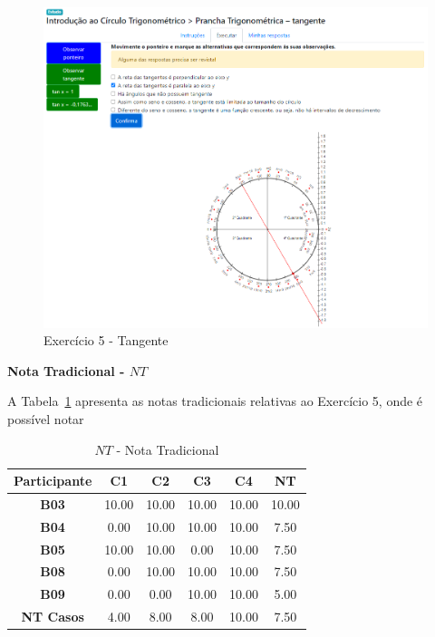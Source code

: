 \begin{figure}[htb]
	\centering
	\includegraphics[width=0.9\linewidth]{chapters/results/Fase 3/E5_Virtual.png}
	\caption{Exercício 5 - Tangente}
	\label{fig:E5}
\end{figure}

\textbf{Nota Tradicional - $NT$}

A Tabela~\ref{tab:F3_A5_NT} apresenta as notas tradicionais relativas ao Exercício 5, onde é possível notar 

\begin{table}[htbp]
	\centering
	\caption{$NT$ - Nota Tradicional}
	\begin{tabular}{|c|c|c|c|c|c|}
		\hline
		\rowcolor[HTML]{D9D9D9} 
		\textbf{Participante} & \textbf{C1} & \textbf{C2} & \textbf{C3} & \textbf{C4} & \textbf{NT} \\ \hline
		\rowcolor[HTML]{FFFFFF} 
		\textbf{B03} & 10.00 & 10.00 & 10.00 & 10.00 & 10.00 \\ \hline
		\rowcolor[HTML]{E7E6E6} 
		\textbf{B04} & 0.00 & 10.00 & 10.00 & 10.00 & 7.50 \\ \hline
		\rowcolor[HTML]{FFFFFF} 
		\textbf{B05} & 10.00 & 10.00 & 0.00 & 10.00 & 7.50 \\ \hline
		\rowcolor[HTML]{E7E6E6} 
		\textbf{B08} & 0.00 & 10.00 & 10.00 & 10.00 & 7.50 \\ \hline
		\rowcolor[HTML]{FFFFFF} 
		\textbf{B09} & 0.00 & 0.00 & 10.00 & 10.00 & 5.00 \\ \hline
		\rowcolor[HTML]{D9D9D9} 
		\textbf{NT Casos} & 4.00 & 8.00 & 8.00 & 10.00 & 7.50 \\ \hline
	\end{tabular}
	\label{tab:F3_A5_NT}
\end{table}

